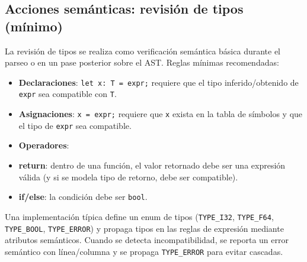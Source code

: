 \documentclass[12pt]{article}
\begin{document}
\subsection{Acciones semánticas: revisión de tipos (mínimo)}
La revisión de tipos se realiza como verificación semántica básica durante el parseo o en un pase posterior sobre el AST. Reglas mínimas recomendadas:
\begin{itemize}[nosep]
  \item \textbf{Declaraciones}: \texttt{let x: T = expr;} requiere que el tipo inferido/obtenido de \texttt{expr} sea compatible con \texttt{T}.
  \item \textbf{Asignaciones}: \texttt{x = expr;} requiere que \texttt{x} exista en la tabla de símbolos y que el tipo de \texttt{expr} sea compatible.
  \item \textbf{Operadores}:
  \item \textbf{return}: dentro de una función, el valor retornado debe ser una expresión válida (y si se modela tipo de retorno, debe ser compatible).
  \item \textbf{if/else}: la condición debe ser \texttt{bool}.
\end{itemize}

Una implementación típica define un enum de tipos (\texttt{TYPE\_I32}, \texttt{TYPE\_F64}, \texttt{TYPE\_BOOL}, \texttt{TYPE\_ERROR}) y propaga tipos en las reglas de expresión mediante atributos semánticos. Cuando se detecta incompatibilidad, se reporta un error semántico con línea/columna y se propaga \texttt{TYPE\_ERROR} para evitar cascadas.
\end{document}

